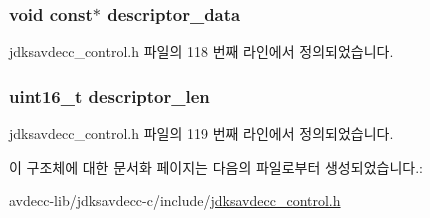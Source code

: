 \subsubsection[{\texorpdfstring{descriptor\+\_\+data}{descriptor_data}}]{\setlength{\rightskip}{0pt plus 5cm}void const$\ast$ descriptor\+\_\+data}\hypertarget{structjdksavdecc__control__info_a79927c7901f9ba81476dc0b6a98810dc}{}\label{structjdksavdecc__control__info_a79927c7901f9ba81476dc0b6a98810dc}


jdksavdecc\+\_\+control.\+h 파일의 118 번째 라인에서 정의되었습니다.

\subsubsection[{\texorpdfstring{descriptor\+\_\+len}{descriptor_len}}]{\setlength{\rightskip}{0pt plus 5cm}uint16\+\_\+t descriptor\+\_\+len}\hypertarget{structjdksavdecc__control__info_af8f69a47554e1b5762d3fe71d4e5926a}{}\label{structjdksavdecc__control__info_af8f69a47554e1b5762d3fe71d4e5926a}


jdksavdecc\+\_\+control.\+h 파일의 119 번째 라인에서 정의되었습니다.



이 구조체에 대한 문서화 페이지는 다음의 파일로부터 생성되었습니다.\+:\begin{DoxyCompactItemize}
\item 
avdecc-\/lib/jdksavdecc-\/c/include/\hyperlink{jdksavdecc__control_8h}{jdksavdecc\+\_\+control.\+h}\end{DoxyCompactItemize}
